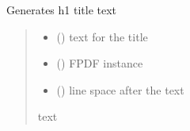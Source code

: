 \documentclass[letterpaper,10pt,english]{sphinxmanual}
\begin{document}
\begin{fulllineitems}
\label{\detokenize{auxilary_functions:auxilary_functions.h1}}
\pysigstartsignatures
{}
\pysigstopsignatures
\sphinxAtStartPar
Generates h1 title text
\begin{quote}\begin{description}
\begin{itemize}
\item {} 
\sphinxAtStartPar
{} () \textendash{} text for the title

\item {} 
\sphinxAtStartPar
{} () \textendash{} FPDF instance

\item {} 
\sphinxAtStartPar
{} () \textendash{} line space after the text

\end{itemize}

\sphinxAtStartPar
text

\end{description}\end{quote}

\end{fulllineitems}

\end{document}
